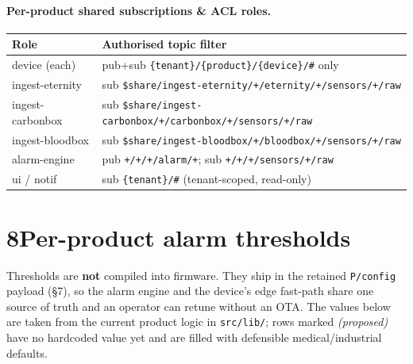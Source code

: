 \documentclass[11pt,a4paper]{article}
\begin{document}
\paragraph{Per-product shared subscriptions \& ACL roles.}
\begin{center}
\small
\begin{tabularx}{\textwidth}{@{}l X@{}}
\toprule
\textbf{Role} & \textbf{Authorised topic filter} \\
\midrule
device (each) & pub+sub \texttt{\{tenant\}/\{product\}/\{device\}/\#} only \\
ingest-eternity   & sub \texttt{\$share/ingest-eternity/+/eternity/+/sensors/+/raw} \\
ingest-carbonbox  & sub \texttt{\$share/ingest-carbonbox/+/carbonbox/+/sensors/+/raw} \\
ingest-bloodbox   & sub \texttt{\$share/ingest-bloodbox/+/bloodbox/+/sensors/+/raw} \\
alarm-engine & pub \texttt{+/+/+/alarm/+}; \quad sub \texttt{+/+/+/sensors/+/raw} \\
ui / notif   & sub \texttt{\{tenant\}/\#} (tenant-scoped, read-only) \\
\bottomrule
\end{tabularx}
\end{center}

\newpage
\section*{8\quad Per-product alarm thresholds}
Thresholds are \textbf{not} compiled into firmware. They ship in the retained
\texttt{P/config} payload (\S7), so the alarm engine and the device's edge fast-path share one
source of truth and an operator can retune without an OTA. The values below are taken from the
current product logic in \texttt{src/lib/}; rows marked \emph{(proposed)} have no hardcoded
value yet and are filled with defensible medical/industrial defaults.
\end{document}
